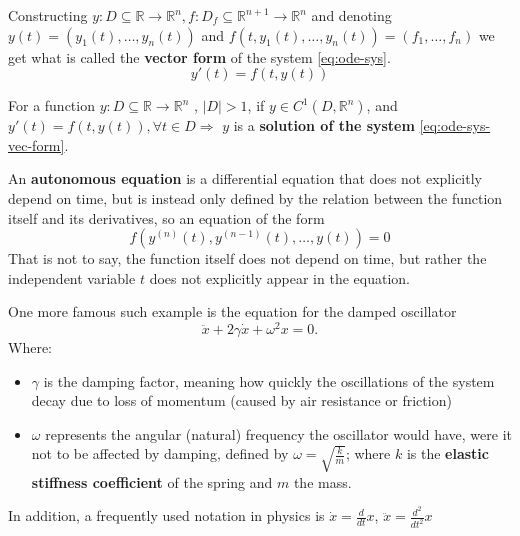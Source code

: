 Constructing $y: D \subseteq \mathbb{R} \rightarrow \mathbb{R}^n, f : D_f \subseteq \mathbb{R}^{n+1} \rightarrow \mathbb{R}^n$ and denoting \\
$y(t)= (y_1(t), \dots, y_n(t))$ and $f(t,y_1(t),\dots,y_n(t)) = (f_1,\dots,f_n)$ we get what is called the \textbf{vector form} of the system \ref{eq:ode-sys}.
\begin{equation}\label{eq:ode-sys-vec-form}
	y'(t) = f (t, y(t))
\end{equation}

\begin{definition}
	For a function $y:D \subseteq \mathbb{R} \rightarrow \mathbb{R}^n$ , $|D| > 1$, if $y \in C^1(D,\mathbb{R}^n)$, and $y'(t) = f(t,y(t)), \forall t \in D \Rightarrow$ $y$ is a \textbf{solution of the system} \ref{eq:ode-sys-vec-form}.
\end{definition}

\begin{definition}
	An \textbf{autonomous equation} \cite{Hiroki2015} is a differential equation that does not explicitly depend on time, but is instead only defined by the relation between the function itself and its derivatives, so an equation of the form
	\begin{equation}\label{eq:3.2.3}
		f(y^{(n)}(t), y^{(n-1)}(t), \dots, y(t))= 0
	\end{equation}
	That is not to say, the function itself does not depend on time, but rather the independent variable $t$ does not explicitly appear in the equation.
\end{definition}

One more famous such example is the equation for the damped oscillator
\begin{equation}\label{eq:3.2.4}
	\ddot{x} + 2\gamma\dot{x} + \omega^2x = 0.
\end{equation}
Where:
\begin{itemize}
	\item $\gamma$ is the damping factor, meaning how quickly the oscillations of the system decay due to loss of momentum (caused by air resistance or friction)

	\item $\omega$ represents the angular (natural) frequency the oscillator would have, were it not to be affected by damping, defined by
		$\omega = \sqrt{\frac{k}{m}}$; where $k$ is the \textbf{elastic stiffness coefficient} of the spring and $m$ the mass.
\end{itemize}

In addition, a frequently used notation in physics is
$\dot{x} = \frac{d}{dt}x$, $\ddot{x}=\frac{d^2}{dt^2}x$

